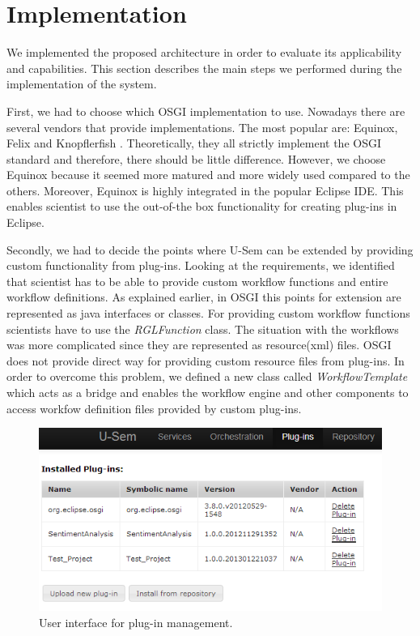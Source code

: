 \section{Implementation}
\label{sec:implPlugin}

We implemented the proposed architecture in order to evaluate its applicability and capabilities. This section describes the main steps we performed during the implementation of the system.

First, we had to choose which OSGI implementation to use. Nowadays there are several vendors that provide implementations. The most popular are: Equinox, Felix and Knopflerfish \cite{OSGI}. Theoretically, they all strictly implement the OSGI standard and therefore, there should be little difference. However, we choose Equinox because it seemed more matured and more widely used compared to the others. Moreover, Equinox is highly integrated in the popular Eclipse IDE. This enables scientist to use the out-of-the box functionality for creating plug-ins in Eclipse.

Secondly, we had to decide the points where U-Sem can be extended by providing custom functionality from plug-ins. Looking at the requirements, we identified that scientist has to be able to provide custom workflow functions and entire workflow definitions. As explained earlier, in OSGI this points for extension are represented as java interfaces or classes. For providing custom workflow functions scientists have to use the \textit{RGLFunction} class. The situation with the workflows was more complicated since they are represented as resource(xml) files. OSGI does not provide direct way for providing custom resource files from plug-ins. In order to overcome this problem, we defined a new class called \textit{WorkflowTemplate} which acts as a bridge and enables the workflow engine and other components to access workfow definition files provided by custom plug-ins.

\begin{figure}[h!]
  \centering
  	\includegraphics[scale=0.70]{plug-in/ui/list.png}
  \caption{User interface for plug-in management.}
  \label{list_ui}
\end{figure}

